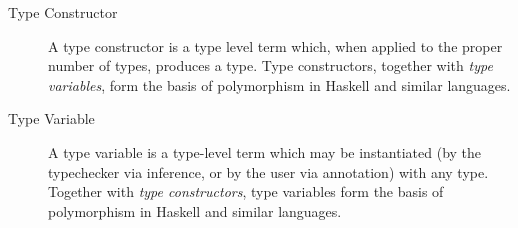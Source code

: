 \begin{description}
\item[Type Constructor] A type constructor is a type level term which, when
applied to the proper number of types, produces a type. Type constructors,
together with {\em type variables}, form the basis of polymorphism in Haskell
and similar languages.

\item[Type Variable] A type variable is a type-level term which may be 
instantiated (by the typechecker via inference, or by the user via annotation)
with any type. Together with {\em type constructors}, type variables form the
basis of polymorphism in Haskell and similar languages.
\end{description}